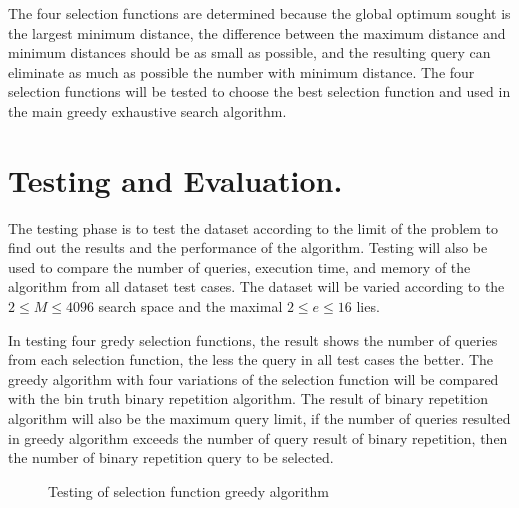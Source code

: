 \documentclass{TTP_DSL2006}
\begin{document}
The four selection functions are determined because the global optimum sought is the largest minimum distance, the difference between the maximum distance and minimum distances should be as small as possible, and the resulting query can eliminate as much as possible the number with minimum distance. The four selection functions will be tested to choose the best selection function and used in the main greedy exhaustive search algorithm.

\section{Testing and Evaluation.}

The testing phase is to test the dataset according to the limit of the problem to find out the results and the performance of the algorithm. Testing will also be used to compare the number of queries, execution time, and memory of the algorithm from all dataset test cases. The dataset will be varied according to the $2 \le M \le 4096$ search space and the maximal $2 \le e \le 16$ lies.

In testing four gredy selection functions, the result shows the number of queries from each selection function, the less the query in all test cases the better. The greedy algorithm with four variations of the selection function will be compared with the bin truth binary repetition algorithm. The result of binary repetition algorithm will also be the maximum query limit, if the number of queries resulted in greedy algorithm exceeds the number of query result of binary repetition, then the number of binary repetition query to be selected.

\begin{figure}
	\centering
	\caption{Testing of selection function greedy algorithm}
	\label{fig:graph_selection_function}
\end{figure}
\end{document}
